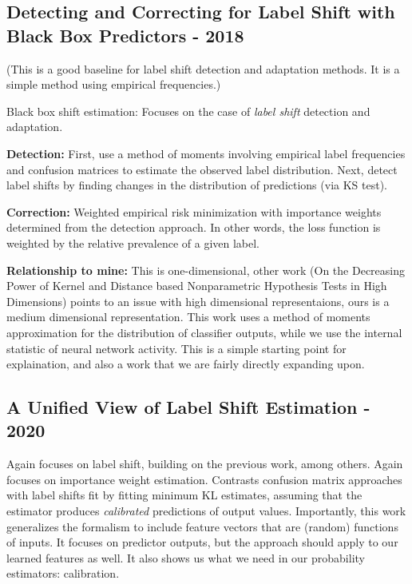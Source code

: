 \documentclass{article}[10pt]      %
\begin{document}
\subsection{Detecting and Correcting for Label Shift with Black Box Predictors - 2018 \cite{lipton_detecting_2018}}
(This is a good baseline for label shift detection and adaptation methods. It is a simple method using empirical frequencies.)

Black box shift estimation: Focuses on the case of \textit{label shift} detection and adaptation.

\noindent \textbf{Detection:} First, use a method of moments involving empirical label frequencies and confusion matrices to estimate the observed label distribution.
Next, detect label shifts by finding changes in the distribution of predictions (via KS test).

\noindent \textbf{Correction:} Weighted empirical risk minimization with importance weights determined from the detection approach.
In other words, the loss function is weighted by the relative prevalence of a given label.

\noindent \textbf{Relationship to mine:}
This is one-dimensional, other work (On the Decreasing Power of Kernel and Distance based Nonparametric Hypothesis Tests in High Dimensions) points to an issue with high dimensional representaions, ours is a medium dimensional representation.
This work uses a method of moments approximation for the distribution of classifier outputs, while we use the internal statistic of neural network activity.
This is a simple starting point for explaination, and also a work that we are fairly directly expanding upon.


\subsection{A Unified View of Label Shift Estimation - 2020 \cite{garg_unified_2020}}
Again focuses on label shift, building on the previous work, among others. Again focuses on importance weight estimation.
Contrasts confusion matrix approaches with label shifts fit by fitting minimum KL estimates, assuming that the estimator produces \textit{calibrated} predictions of output values.
Importantly, this work generalizes the formalism to include feature vectors that are (random) functions of inputs.
It focuses on predictor outputs, but the approach should apply to our learned features as well.
It also shows us what we need in our probability estimators: calibration.
\end{document}
